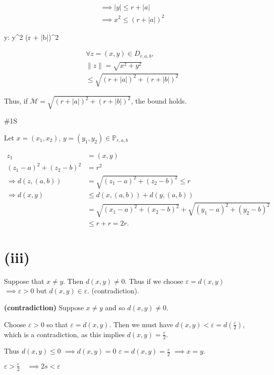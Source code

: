 \documentclass{article}
\theoremstyle{definition}
\numberwithin{equation}{section}
\begin{document}
\begin{align*}
&\implies |y| \leq r + |a| \\
&\implies x^2 \leq (r + |a|)^2
\end{align*}

 y: \quad y^2 \leq (r + |b|)^2

\begin{align*}
&\forall z = (x, y) \in D_{r, a, b}, \\
&\|z\| = \sqrt{x^2 + y^2} \\
&\leq \sqrt{(r + |a|)^2 + (r + |b|)^2}
\end{align*}

Thus, if \(\mathcal{M} = \sqrt{(r + |a|)^2 + (r + |b|)^2}\), the bound holds.

\#1S 

Let \( x = (x_1, x_2), \, y = (y_1, y_2) \in \mathbb{P}_{r, a, b} \)

\begin{align*}
z_1 &= (x, y) \\
(z_1 - a)^2 + (z_2 - b)^2 &= r^2 \\
\Rightarrow d(z, (a, b)) &= \sqrt{(z_1 - a)^2 + (z_2 - b)^2} \leq r \\
\Rightarrow d(x, y) &\leq d(x, (a, b)) + d(y, (a, b)) \\
&= \sqrt{(x_1 - a)^2 + (x_2 - b)^2} + \sqrt{(y_1 - a)^2 + (y_2 - b)^2} \\
&\leq r + r = 2r.
\end{align*}

\section*{(iii)}
Suppose that \( x \neq y \). Then \( d(x, y) \neq 0 \). Thus if we choose \( \varepsilon = d(x, y) \) \(\implies \varepsilon > 0 \) but \( d(x, y) \in \varepsilon \). (contradiction).

\textbf{(contradiction)} Suppose \( x \neq y \) and so \( d(x, y) \neq 0 \).

Choose \( \varepsilon > 0 \) so that \( \varepsilon = d(x, y) \). Then we must have \( d(x, y) < \varepsilon = d\left(\frac{\varepsilon}{2}\right) \), which is a contradiction, as this implies \( d(x, y) = \frac{\varepsilon}{2} \).

Thus \( d(x, y) \leq 0\) \(\implies d(x, y) = 0\) \(\varepsilon = d(x, y) = \frac{\varepsilon}{2}\) \(\implies x = y \).

$
\varepsilon > \frac{\varepsilon}{2} \quad \implies 2s < \varepsilon
$
\end{document}
